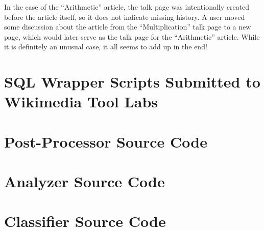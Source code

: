\documentclass[14pt,a4paper]{report}
\begin{document}
In the case of the ``Arithmetic'' article, the talk page was intentionally created before the article itself, so it does not indicate missing history. A user moved some discussion about the article from the ``Multiplication'' talk page to a new page, which would later serve as the talk page for the ``Arithmetic'' article. \autocite{arithmetic,arithmetictalk} While it is definitely an unusual case, it all seems to add up in the end!

\printbibliography[heading=bibintoc,title={References}]
\appendix
\appendixpage
\chapter{SQL Wrapper Scripts Submitted to Wikimedia Tool Labs}\label{appendix:db}












\chapter{Post-Processor Source Code}\label{appendix:eeprocess}

\chapter{Analyzer Source Code}\label{appendix:eeanalyze}

\chapter{Classifier Source Code}\label{appendix:eeclassify}

\end{document}
